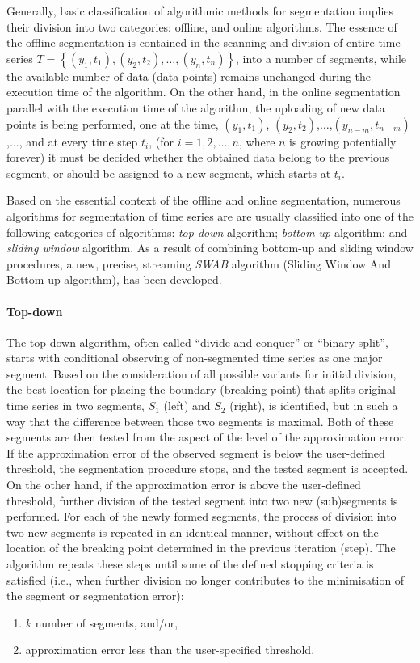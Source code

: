 \documentclass[a4paper]{article}
\begin{document}
Generally, basic classification of algorithmic methods for segmentation implies their division into two categories: offline, and online algorithms. The essence of the offline segmentation is contained in the scanning and division of entire time series $ T = \left\{ \left( y_1, t_1\right), \left(y_2, t_2 \right), \dots ,\left(y_n, t_n\right)\right\} $, into a number of segments, while the available number of data (data points) remains unchanged during the execution time of the algorithm. On the other hand, in the online segmentation parallel with the execution time of the algorithm, the uploading of new data points is being performed, one at the time, $\left( y_1, t_1\right)$, $\left(y_2, t_2 \right)$,$\dots$,$\left(y_{n-m}, t_{n-m} \right)$,$\dots$, and at every time step $t_i$, (for $i = 1,2, \dots ,n$, where $n$ is growing potentially forever) it must be decided whether the obtained data belong to the previous segment, or should be assigned to a new segment, which starts at $t_i$. 

Based on the essential context of the offline and online segmentation, numerous algorithms for segmentation of time series are are usually classified into one of the following categories of algorithms: \emph{top-down} algorithm; \emph{bottom-up} algorithm; and \emph{sliding window} algorithm. As a result of combining bottom-up and sliding window procedures, a new, precise, streaming \emph{SWAB} algorithm (Sliding Window And Bottom-up algorithm), has been developed.

\paragraph{Top-down} The top-down algorithm, often called \enquote{divide and conquer} or \enquote{binary split}, starts with conditional observing of non-segmented time series as one major segment. Based on the consideration of all possible variants for initial division, the best location for placing the boundary (breaking point) that splits original time series in two segments, $S_1$ (left) and $S_2$ (right), is identified, but in such a way that the difference between those two segments is maximal. Both of these segments are then tested from the aspect of the level of the approximation error. If the approximation error of the observed segment is below the user-defined threshold, the segmentation procedure stops, and the tested segment is accepted. On the other hand, if the approximation error is above the user-defined threshold, further division of the tested segment into two new (sub)segments is performed. For each of the newly formed segments, the process of division into two new segments is repeated in an identical manner, without effect on the location of the breaking point determined in the previous iteration (step). The algorithm repeats these steps until some of the defined stopping criteria is satisfied (i.e., when further division no longer contributes to the minimisation of the segment or segmentation error): 
\begin{enumerate}
	\item $k$ number of segments, and/or,
	\item approximation error less than the user-specified threshold.
\end{enumerate} 
\end{document}
